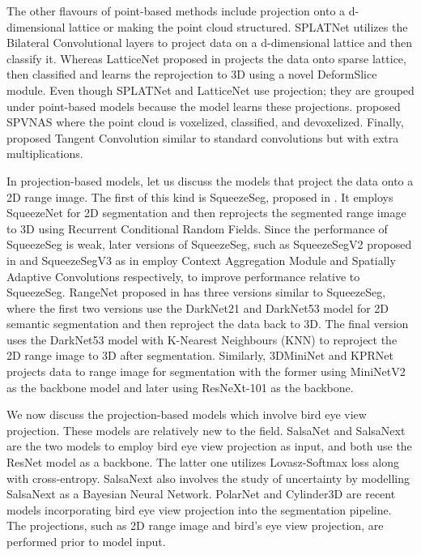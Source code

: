 The other flavours of point-based methods include projection onto a d-dimensional lattice or making the point cloud structured.
SPLATNet \cite{Su_2018_CVPR_splatnet} utilizes the Bilateral Convolutional layers to project data on a d-dimensional lattice and then classify it.
Whereas LatticeNet proposed in \cite{rosu2019latticenet} projects the data onto sparse lattice, then classified and learns the reprojection to 3D using a novel DeformSlice module.
Even though SPLATNet and LatticeNet use projection; they are grouped under point-based models because the model learns these projections.
\cite{spvnas} proposed SPVNAS where the point cloud is voxelized, classified, and devoxelized.
Finally, \cite{Tatarchenko_2018_CVPR_tangconv} proposed Tangent Convolution similar to standard convolutions but with extra multiplications.

In projection-based models, let us discuss the models that project the data onto a 2D range image.
The first of this kind is SqueezeSeg, proposed in \cite{Sequeseseg_2018}. It employs SqueezeNet for 2D segmentation and then reprojects the segmented range image to 3D using Recurrent Conditional Random Fields.
Since the performance of SqueezeSeg is weak, later versions of SqueezeSeg, such as SqueezeSegV2 proposed in \cite{SqueezeSegv2} and SqueezeSegV3 as in \cite{xu2020squeezesegv3} employ Context Aggregation Module and Spatially Adaptive Convolutions respectively, to improve performance relative to SqueezeSeg.
RangeNet proposed in \cite{Milioto2019} has three versions similar to SqueezeSeg, where the first two versions use the DarkNet21 and DarkNet53 model for 2D semantic segmentation and then reproject the data back to 3D.
The final version uses the DarkNet53 model with K-Nearest Neighbours (KNN) to reproject the 2D range image to 3D after segmentation.
Similarly, 3DMiniNet \cite{3Dmininet} and KPRNet \cite{kochanov2020kprnet} projects data to range image for segmentation with the  former using MiniNetV2 as the backbone model and later using ResNeXt-101 as the backbone.

We now discuss the projection-based models which involve bird eye view projection.
These models are relatively new to the field.
SalsaNet \cite{salsanet2020} and SalsaNext \cite{SalsaNext_2020} are the two models to employ bird eye view projection as input, and both use the ResNet
model as a backbone.
The latter one utilizes Lovasz-Softmax loss along with cross-entropy.
SalsaNext also involves the study of uncertainty by modelling SalsaNext as a Bayesian Neural Network.
PolarNet \cite{polarnet} and Cylinder3D \cite{zhu2020cylindrical} are recent models incorporating bird eye view projection into the segmentation pipeline.
The projections, such as 2D range image and bird's eye view projection, are performed prior to model input.

